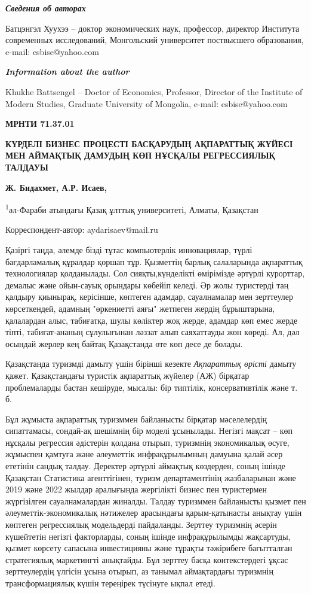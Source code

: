 \emph{{\bfseries Сведения об авторах}}

Батцэнгэл Хуухээ -- доктор экономических наук, профессор, директор
Института современных исследований, Монгольский университет поствысшего
образования, e-mail: esbise@yahoo.com

\emph{{\bfseries Information about the author}}

Khukhe Battsengel -- Doctor of Economics, Professor, Director of the
Institute of Modern Studies, Graduate University of Mongolia, e-mail:
esbise@yahoo.com

\emph{{\bfseries \hfill\break
}}\newpage
{\bfseries МРНТИ 71.37.01}

{\bfseries КҮРДЕЛІ БИЗНЕС ПРОЦЕСТІ БАСҚАРУДЫҢ АҚПАРАТТЫҚ ЖҮЙЕСІ МЕН
АЙМАҚТЫҚ ДАМУДЫҢ КӨП НҰСҚАЛЫ РЕГРЕССИЯЛЫҚ ТАЛДАУЫ}

{\bfseries Ж. Бидахмет, А.Р. Исаев,}

\textsuperscript{1}әл-Фараби атындағы Қазақ ұлттық университеті, Алматы,
Қазақстан

Корреспондент-автор: aydarisaev@mail.ru

Қазіргі таңда, әлемде бізді тұтас компьютерлік инновациялар, түрлі
бағдарламалық құралдар қоршап тұр. Қызметтің барлық салаларында
ақпараттық технологиялар қолданылады. Сол сияқты,күнделікті өмірімізде
әртүрлі курорттар, демалыс және ойын-сауық орындары көбейіп келеді. Әр
жолы туристерді таң қалдыру қиынырақ, керісінше, көптеген адамдар,
сауалнамалар мен зерттеулер көрсеткендей, адамның "өркениетті аяғы"
жетпеген жердің бұрыштарына, қалалардан алыс, табиғатқа, шулы көліктер
жоқ жерде, адамдар көп емес жерде тіпті, табиғат-ананың сұлулығынан
ләззат алып саяхаттауды жөн көреді. Ал, дәл осындай жерлер кең байтақ
Қазақстанда өте көп десе де болады.

Қазақстанда туризмді дамыту үшін бірінші кезекте \emph{Ақпараттық
өрісті} дамыту қажет. Қазақстандағы туристік ақпараттық жүйелер (АЖ)
бірқатар проблемаларды бастан кешіруде, мысалы: бір типтілік,
консервативтілік және т. б.

Бұл жұмыста ақпараттық туризммен байланысты бірқатар мәселелердің
сипаттамасы, сондай-ақ шешімнің бір моделі ұсынылады. Негізгі мақсат --
көп нұсқалы регрессия әдістерін қолдана отырып, туризмнің экономикалық
өсуге, жұмыспен қамтуға және әлеуметтік инфрақұрылымның дамуына қалай
әсер ететінін сандық талдау. Деректер әртүрлі аймақтық көздерден, соның
ішінде Қазақстан Статистика агенттігінен, туризм департаментінің
жазбаларынан және 2019 және 2022 жылдар аралығында жергілікті бизнес пен
туристермен жүргізілген сауалнамалардан жиналды. Талдау туризммен
байланысты қызмет пен әлеуметтік-экономикалық нәтижелер арасындағы
қарым-қатынасты анықтау үшін көптеген регрессиялық модельдерді
пайдаланды. Зерттеу туризмнің әсерін күшейтетін негізгі факторларды,
соның ішінде инфрақұрылымды жақсартуды, қызмет көрсету сапасына
инвестицияны және тұрақты тәжірибеге бағытталған стратегиялық
маркетингті анықтайды. Бұл зерттеу басқа контекстердегі ұқсас
зерттеулердің үлгісін ұсына отырып, аз танымал аймақтардағы туризмнің
трансформациялық күшін тереңірек түсінуге ықпал етеді.

